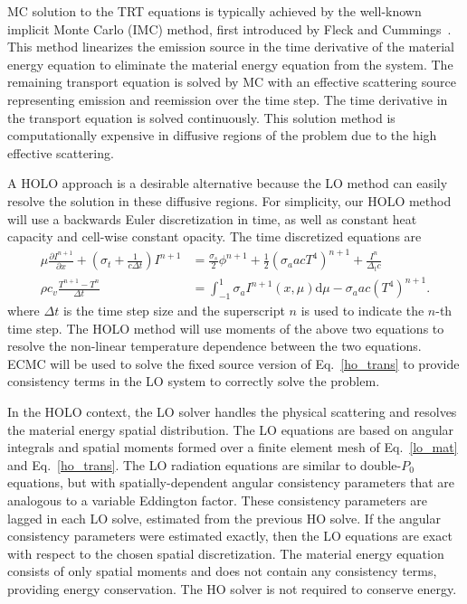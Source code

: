 \documentclass{mc2013}
\newcommand{\pderiv}[2]{\frac{\partial #1}{\partial #2}}
\renewcommand{\d}{\mathrm{d}}
\begin{document}
MC solution to the TRT equations is typically achieved by the well-known
implicit Monte Carlo (IMC) method, first introduced by Fleck and Cummings~\cite{fnc}. This
method linearizes the emission source in the time derivative of the material energy
equation to eliminate the material energy equation from the system.  The remaining
transport equation is solved by MC with an effective scattering source representing
emission and reemission over the time step.  The time derivative in the transport
equation is solved continuously.  This
solution method is computationally expensive in diffusive regions of the problem due
to the high effective scattering. 

A HOLO approach is a desirable alternative because
the LO method can easily resolve the solution in these diffusive regions.
For simplicity, our HOLO method will use a backwards Euler discretization in time, as
well as constant heat capacity and cell-wise constant opacity. The time discretized
equations are
\begin{align}
\mu \pderiv{I^{n+1}}{x} + \left(\sigma_t + \frac{1}{c \Delta t }\right) I^{n+1}
&= \frac{\sigma_s}{2} \phi^{n+1} +\frac{1}{2} \left(\sigma_a a c T^4
\right)^{n+1} + \frac{I^n}{\Delta_t c} \label{ho_trans} \\
\rho c_v \frac{T^{n+1} - T^n}{\Delta t} &= \int_{-1}^{1} \sigma_a I^{n+1}(x,\mu)
\d\mu - \sigma_a a c (T^4)^{n+1} \label{lo_mat}.
\end{align}
where $\Delta t$ is the time step size and the superscript $n$ is used to indicate
the $n$-th time step.  The HOLO method will use moments of the above two equations to
resolve the non-linear temperature dependence between the two equations.  ECMC will
be used to solve the fixed source version of Eq.~\eqref{ho_trans} to provide
consistency terms in the LO system to correctly solve the problem.


In the HOLO context, the LO solver handles the physical scattering and
resolves the material energy spatial distribution.  The LO equations are based on
angular integrals and spatial moments formed over a finite element mesh of
Eq.~\eqref{lo_mat} and Eq.~\eqref{ho_trans}. The LO radiation equations are similar to
double-$P_0$ equations, but with
spatially-dependent angular consistency parameters that are analogous to a variable
Eddington factor.  These consistency parameters are lagged in each LO solve,
estimated from the previous HO solve.  
If the angular consistency parameters were estimated exactly, then the LO equations are exact with respect to the chosen
spatial discretization. The material energy equation consists of only spatial moments and does not contain
any consistency terms, providing energy conservation. The HO solver is not required
to conserve energy.
\end{document}
